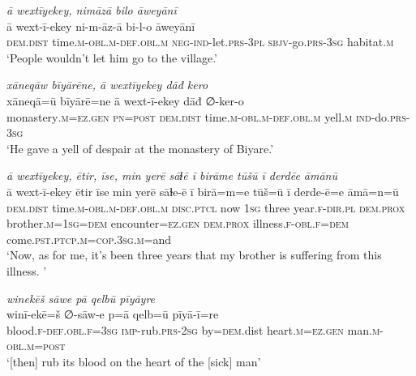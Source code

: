 \ea \label{DG.23}
\textit{ā wextīyekey, nimāzā bilo āweyānī} \\ 
\gll ā wext-ī-ekey ni-m-āz-ā bi-l-o āweyānī \\ 
 \textsc{dem.dist} time\textsc{.m}\textsc{-obl}\textsc{.m}\textsc{-def}\textsc{.obl}\textsc{.m} \textsc{neg-}\textsc{ind-}let\textsc{.prs}\textsc{-3pl} \textsc{sbjv-}go\textsc{.prs}\textsc{-3sg} habitat\textsc{\textsc{.m}} \\ 
\glt `People wouldn’t let him go to the village.'
\z 
 
\ea \label{DG.33}
\textit{xāneqāw bīyārēne, ā wextīyekey dāđ kero} \\ 
\gll xāneqā=ū bīyārē=ne ā wext-ī-ekey dāđ ∅-ker-o \\ 
 monastery\textsc{.m}\textsc{=ez}\textsc{.gen} \textsc{pn}\textsc{=\textsc{post}} \textsc{dem.dist} time\textsc{.m}\textsc{-obl}\textsc{.m}\textsc{-def}\textsc{.obl}\textsc{.m} yell\textsc{.m} \textsc{ind-}do\textsc{.prs}\textsc{-3sg} \\ 
\glt `He gave a yell of despair at the monastery of Biyare.'
\z 
 
\ea \label{DG.38}
\textit{ā wextīyekey, ētir, īse, min yerē sāɫē ī birāme tūšū ī derdēe āmānū} \\ 
\gll ā wext-ī-ekey ētir īse min yerē sāɫe-ē ī birā=m=e tūš=ū ī derde-ē=e āmā=n=ū \\ 
 \textsc{dem.dist} time\textsc{.m}\textsc{-obl}\textsc{.m}\textsc{-def}\textsc{.obl}\textsc{.m} \textsc{disc.ptcl} now \textsc{1sg} three year\textsc{\textsc{.f}}\textsc{-dir}\textsc{.pl} \textsc{dem.prox} brother\textsc{.m}\textsc{=1sg}\textsc{=dem} encounter\textsc{=ez}\textsc{.gen} \textsc{dem.prox} illness\textsc{\textsc{.f}}\textsc{-obl}\textsc{\textsc{.f}}\textsc{=dem} come\textsc{.pst}\textsc{.ptcp}\textsc{.m}\textsc{=cop}\textsc{.3sg}\textsc{.m}=and \\ 
\glt `Now, as for me, it’s been three years that my brother is suffering from this illness. '
\z 
 
\ea \label{DG.50}
\textit{winekēš sāwe pā qelbū pīyāyre} \\ 
\gll winī-ekē=š ∅-sāw-e p=ā qelb=ū pīyā-ī=re \\ 
 blood\textsc{\textsc{.f}}\textsc{-def}\textsc{.obl}\textsc{\textsc{.f}}\textsc{=3sg} \textsc{imp-}rub\textsc{.prs}-\textsc{2sg} by\textsc{=dem}.dist heart\textsc{.m}\textsc{=ez}\textsc{.gen} man\textsc{.m}\textsc{-obl}\textsc{.m}\textsc{=\textsc{post}} \\ 
\glt `[then] rub its blood on the heart of the [sick] man'
\z 
 
